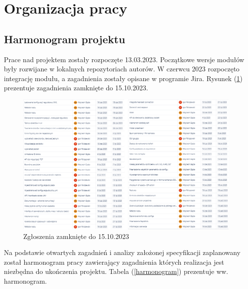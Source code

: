 \documentclass[15pt]{sprawozdanie}
\begin{document}
\newpage
\section{Organizacja pracy}
\subsection{Harmonogram projektu}

Prace nad projektem zostały rozpoczęte 13.03.2023. Początkowe wersje modułów były rozwijane w lokalnych repozytoriach autorów. W czerwcu 2023 rozpoczęto integrację modułu, a zagadnienia zostały opisane w programie Jira. Rysunek (\ref{zamkniete_jira}) prezentuje zagadnienia zamknięte do 15.10.2023.

\begin{figure}[!h]
\centering
\includegraphics[width=\textwidth]{jira_june_sept.png}
\caption{Zgłoszenia zamknięte do 15.10.2023}
\label{zamkniete_jira}
\end{figure}

Na podstawie otwartych zagadnień i analizy założonej specyfikacji zaplanowany został harmonogram pracy zawierający zagadnienia których realizacja jest niezbędna do ukończenia projektu. Tabela (\ref{harmonogram}) prezentuje ww. harmonogram. 
\end{document}
